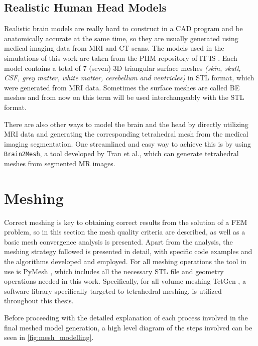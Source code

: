 \subsection{Realistic Human Head Models}
\label{sec:phm_models}

Realistic brain models are really hard to construct in a \gls{CAD} program and be anatomically accurate at the same time, so they are usually generated using medical imaging data from \gls{MRI} and \gls{CT} scans. The models used in the simulations of this work are taken from the \gls{PHM} repository of \gls{IT'IS} \cite{ErikG.Lee2016,Lee2018,ITstissue}. Each model contains a total of 7 (seven) 3D triangular surface meshes \textit{(skin, skull, \gls{CSF}, grey matter, white matter, cerebellum and ventricles)} in \gls{STL} format, which were generated from \gls{MRI} data. Sometimes the surface meshes are called \gls{BE} meshes and from now on this term will be used interchangeably with the \gls{STL} format.

There are also other ways to model the brain and the head by directly utilizing \gls{MRI} data and generating the corresponding tetrahedral mesh from the medical imaging segmentation. One streamlined and easy way to achieve this is by using \texttt{Brain2Mesh}, a tool developed by Tran et al.\cite{Tran2020}, which can generate tetrahedral meshes from segmented \gls{MR} images.

\section{Meshing}
\label{sec:fem_meshing}

Correct meshing is key to obtaining correct results from the solution of a \gls{FEM} problem, so in this section the mesh quality criteria are described, as well as a basic mesh convergence analysis is presented. Apart from the analysis, the meshing strategy followed is presented in detail, with specific code examples and the algorithms developed and employed. For all meshing operations the tool in use is PyMesh \cite{pymesh}, which includes all the necessary \gls{STL} file and geometry operations needed in this work. Specifically, for all volume meshing TetGen \cite{tetgen}, a software library specifically targeted to tetrahedral meshing, is utilized throughout this thesis.

Before proceeding with the detailed explanation of each process involved in the final meshed model generation, a high level diagram of the steps involved can be seen in \autoref{fig:mesh_modelling}.

